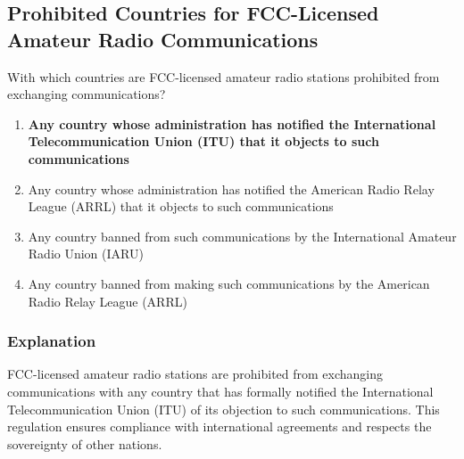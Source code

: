 \subsection{Prohibited Countries for FCC-Licensed Amateur Radio Communications}
\label{T1D01}

\begin{tcolorbox}[colback=gray!10!white,colframe=black!75!black,title=T1D01]
With which countries are FCC-licensed amateur radio stations prohibited from exchanging communications?
\begin{enumerate}[label=\Alph*,noitemsep]
    \item \textbf{Any country whose administration has notified the International Telecommunication Union (ITU) that it objects to such communications}
    \item Any country whose administration has notified the American Radio Relay League (ARRL) that it objects to such communications
    \item Any country banned from such communications by the International Amateur Radio Union (IARU)
    \item Any country banned from making such communications by the American Radio Relay League (ARRL)
\end{enumerate}
\end{tcolorbox}

\subsubsection*{Explanation}
FCC-licensed amateur radio stations are prohibited from exchanging communications with any country that has formally notified the International Telecommunication Union (ITU) of its objection to such communications. This regulation ensures compliance with international agreements and respects the sovereignty of other nations.
